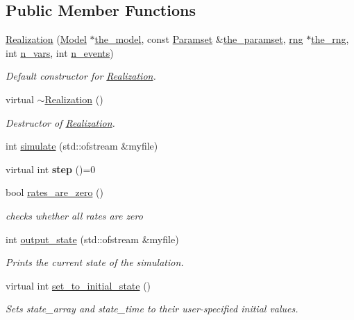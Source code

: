 \subsection*{Public Member Functions}
\begin{DoxyCompactItemize}
\item 
\hyperlink{class_realization_af4cfb6f2221bef9ba5ad09564796677f}{Realization} (\hyperlink{class_model}{Model} $\ast$\hyperlink{class_realization_a47ec1d062b8caee874b08c1a17d6aeeb}{the\+\_\+model}, const \hyperlink{class_paramset}{Paramset} \&\hyperlink{class_realization_a119bb29de88929bc51bc1b329473a94b}{the\+\_\+paramset}, \hyperlink{classrng}{rng} $\ast$\hyperlink{class_realization_ac8d358d929afae90cf5790675b6744f9}{the\+\_\+rng}, int \hyperlink{class_realization_ad9951a0829e68e12fcb3817735bb5097}{n\+\_\+vars}, int \hyperlink{class_realization_afb711282bef806fc0020f91252d1df2c}{n\+\_\+events})
\begin{DoxyCompactList}\small\item\em Default constructor for \hyperlink{class_realization}{Realization}. \end{DoxyCompactList}\item 
virtual \hyperlink{class_realization_a040c39b39c5057c668bd264b4329f2b4}{$\sim$\+Realization} ()
\begin{DoxyCompactList}\small\item\em Destructor of \hyperlink{class_realization}{Realization}. \end{DoxyCompactList}\item 
int \hyperlink{class_realization_a4e21bc7355e33c17d1401736b3c62413}{simulate} (std\+::ofstream \&myfile)
\item 
\mbox{\label{class_realization_a9949217117927b149850288f3b74c9ef}} 
virtual int {\bfseries step} ()=0
\item 
bool \hyperlink{class_realization_a48953442ebf235cd1e02731c7419f65f}{rates\+\_\+are\+\_\+zero} ()
\begin{DoxyCompactList}\small\item\em checks whether all rates are zero \end{DoxyCompactList}\item 
int \hyperlink{class_realization_ab7ef90279eef4bf11261084f541c7bb0}{output\+\_\+state} (std\+::ofstream \&myfile)
\begin{DoxyCompactList}\small\item\em Prints the current state of the simulation. \end{DoxyCompactList}\item 
virtual int \hyperlink{class_realization_a391a89af7574a9053f53f8a299c2cc70}{set\+\_\+to\+\_\+initial\+\_\+state} ()
\begin{DoxyCompactList}\small\item\em Sets state\+\_\+array and state\+\_\+time to their user-\/specified initial values. \end{DoxyCompactList}\end{DoxyCompactItemize}
